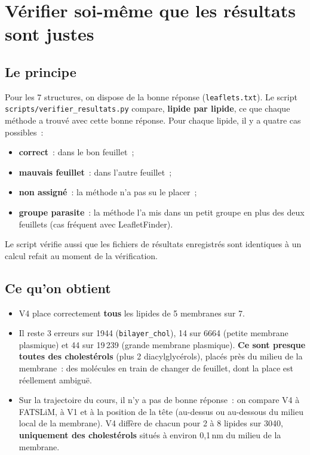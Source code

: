 \documentclass[11pt,a4paper]{article}
\newcommand{\f}[1]{\texttt{#1}}
\begin{document}
\section{Vérifier soi-même que les résultats sont justes}
\subsection{Le principe}
Pour les 7 structures, on dispose de la bonne réponse (\f{leaflets.txt}). Le script
\f{scripts/verifier\_resultats.py} compare, \textbf{lipide par lipide}, ce que chaque méthode a trouvé avec cette
bonne réponse. Pour chaque lipide, il y a quatre cas possibles~:
\begin{itemize}
\item \textbf{correct}~: dans le bon feuillet~;
\item \textbf{mauvais feuillet}~: dans l'autre feuillet~;
\item \textbf{non assigné}~: la méthode n'a pas su le placer~;
\item \textbf{groupe parasite}~: la méthode l'a mis dans un petit groupe en plus des deux feuillets (cas fréquent
avec LeafletFinder).
\end{itemize}
Le script vérifie aussi que les fichiers de résultats enregistrés sont identiques à un calcul refait au moment de la
vérification.

\subsection{Ce qu'on obtient}
\begin{itemize}
\item V4 place correctement \textbf{tous} les lipides de 5 membranes sur 7.
\item Il reste 3 erreurs sur 1944 (\f{bilayer\_chol}), 14 sur 6664 (petite membrane plasmique) et 44 sur 19\,239
(grande membrane plasmique). \textbf{Ce sont presque toutes des cholestérols} (plus 2 diacylglycérols), placés près
du milieu de la membrane~: des molécules en train de changer de feuillet, dont la place est réellement ambiguë.
\item Sur la trajectoire du cours, il n'y a pas de bonne réponse~: on compare V4 à FATSLiM, à V1 et à la position de
la tête (au-dessus ou au-dessous du milieu local de la membrane). V4 diffère de chacun pour 2 à 8 lipides sur 3040,
\textbf{uniquement des cholestérols} situés à environ 0,1\,nm du milieu de la membrane.
\end{itemize}
\end{document}
